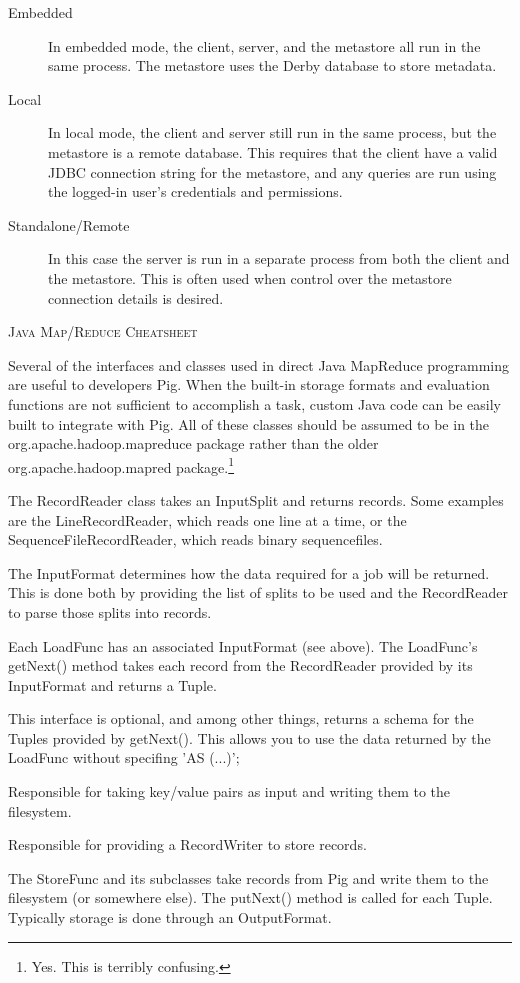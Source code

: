 \documentclass[10pt,letterpaper,twoside]{letter}
\begin{document}
\begin{description}
\item[Embedded] In embedded mode, the client, server, and the metastore all run in the same process.  The metastore uses the Derby database to store metadata.
\item[Local] In local mode, the client and server still run in the same process, but the metastore is a remote database.  This requires that the client have a valid JDBC connection string for the metastore, and any queries are run using the logged-in user's credentials and permissions.
\item[Standalone/Remote] In this case the server is run in a separate process from both the client and the metastore.  This is often used when control over the metastore connection details is desired.
\end{description}
\begin{center}
\textsc{\large Java Map/Reduce Cheatsheet}
\end{center}
Several of the interfaces and classes used in direct Java MapReduce programming are useful to developers Pig.  When the built-in storage formats and evaluation functions are not sufficient to accomplish a task, custom Java code can be easily built to integrate with Pig.  All of these classes should be assumed to be in the org.apache.hadoop.mapreduce package rather than the older org.apache.hadoop.mapred package.\footnote{Yes. This is terribly confusing.}
\begin{description} [style=nextline]
\item[org.apache.hadoop.mapreduce.RecordReader$<$K,V$>$] The RecordReader class takes an InputSplit and returns records.  Some examples are the LineRecordReader, which reads one line at a time, or the SequenceFileRecordReader, which reads binary sequencefiles.
\item[org.apache.hadoop.mapreduce.InputFormat$<$K,V$>$] The InputFormat determines how the data required for a job will be returned.  This is done both by providing the list of splits to be used and the RecordReader to parse those splits into records.
\item[org.apache.pig.LoadFunc] Each LoadFunc has an associated InputFormat (see above).  The LoadFunc's getNext() method takes each record from the RecordReader provided by its InputFormat and returns a Tuple.
\item[org.apache.pig.LoadMetadata] This interface is optional, and among other things, returns a schema for the Tuples provided by getNext(). This allows you to use the data returned by the LoadFunc without specifing 'AS (...)'; 
\item[org.apache.hadoop.mapreduce.RecordWriter$<$K,V$>$] Responsible for taking key/value pairs as input and writing them to the filesystem.
\item[org.apache.hadoop.mapreduce.OutputFormat$<$K,V$>$] Responsible for providing a RecordWriter to store records.
\item[org.apache.pig.StoreFunc] The StoreFunc and its subclasses take records from Pig and write them to the filesystem (or somewhere else).  The putNext() method is called for each Tuple.  Typically storage is done through an OutputFormat.
\end{description}
\end{document}
